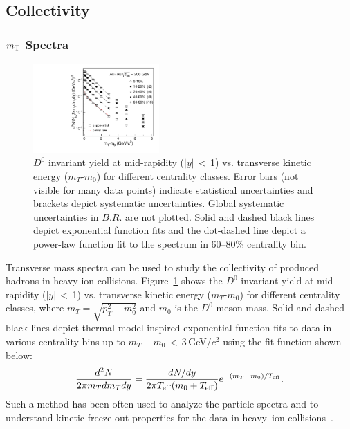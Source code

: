 \documentclass[%
 reprint,	
 amsmath,amssymb,
 aps,
 prc,
]{revtex4-1}
\begin{document}
\subsection{Collectivity}
\label{result:collectivity}

\subsubsection{$m_{\rm T}$ Spectra}
\label{result:collectivity:mT}

\begin{figure}
\centering
\includegraphics[width=0.43\textwidth]{fig/mTFit_D0.pdf}
\caption{$D^{0}$ invariant yield at mid-rapidity ($|y|$\,$<$\,1) vs. transverse kinetic energy ($m_{T}$-$m_{0}$) for different centrality classes. Error bars (not visible for many data points) indicate statistical uncertainties and brackets depict systematic uncertainties. Global systematic uncertainties in $B.R.$ are not plotted. Solid and dashed black lines depict exponential function fits and the dot-dashed line depict a power-law function fit to the spectrum in 60--80\% centrality bin.}
\label{fig:mTFit_D0} 
\end{figure}

Transverse mass spectra can be used to study the collectivity of produced hadrons in heavy-ion collisions. Figure~\ref{fig:mTFit_D0} shows the $D^{0}$ invariant yield at mid-rapidity ($|y|$\,$<$\,1) vs. transverse kinetic energy ($m_{T}$-$m_{0}$) for different centrality classes, where $m_{T} = \sqrt{p_{T}^2+m_0^2}$ and $m_0$ is the $D^0$ meson mass. Solid and dashed black lines depict thermal model inspired exponential function fits to data in various centrality bins up to $m_{T}-m_{0}$\,$<$\,3\,GeV/$c^2$ using the fit function shown below:
\begin{equation}
  \begin{aligned}
\frac{d^2N}{2\pi m_{T}dm_{T}dy} = \frac{dN/dy}{2\pi T_{\rm eff}(m_0+T_{\rm eff})}e^{-(m_{T}-m_0)/T_{\rm eff}}.
  \end{aligned}
\label{equ:equation5}
\end{equation}
Such a method has been often used to analyze the particle spectra and to understand kinetic freeze-out properties for the data in heavy--ion collisions~\cite{Kaneta:1999lnf,StarWhitePaper}.
\end{document}
